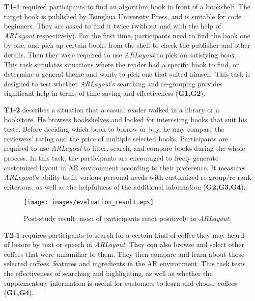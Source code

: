 \textbf{T1-1} required participants to find an algorithm book in front of a bookshelf.
The target book is published by Tsinghua University Press, and is suitable for code beginners.
They are asked to find it twice (without and with the help of \textit{ARLayout} respectively).
For the first time, participants need to find the book one by one, and pick up certain books
from the shelf to check the publisher and other details.
Then they were required to use \textit{ARLayout} to pick an satisfying book.
This task simulates situations where the reader had a specific book to find,
or determine a general theme and wants to pick one that suited himself.
This task is designed to test whether \textit{ARLayout}'s
searching and re-grouping provides significant help 
in terms of time-saving and effectiveness (\textbf{G1,G2}).


\textbf{T1-2} describes a situation that a casual reader walked in a library or a bookstore.
He browses bookshelves and looked for interesting books that suit his taste.
Before deciding which book to borrow or buy,
he may compare the reviewers' rating and the price of multiple selected books.
Participants are required to use \textit{ARLayout} to filter, search, and compare books during the whole process.
In this task, %
the participants are encouraged to freely generate customized layout in AR environment according to their preference.
It measures \textit{ARLayout}'s ability to fit various personal needs with customized re-group/re-rank criterions,
as well as the helpfulness of the additional information (\textbf{G2,G3,G4}).


\begin{figure}[htb]
    \centering
    \texttt{[image: images/evaluation\_result.eps]}
    \caption{
        Post-study result: most of participants react positively to \textit{ARLayout}.
    }
    \label{fig:evaluation_result}
\end{figure}


\textbf{T2-1} requires participants to search for a certain kind of coffee
they may heard of before by text or speech in \textit{ARLayout}.
They cqn also browse and select other coffees that were unfamiliar to them.
They then compare and learn about those selected coffees' features and ingredients in the AR environment.
This task tests the effectiveness of searching and highlighting,
as well as whether the supplementary information is useful
for customers to learn and choose coffees (\textbf{G1,G4}).


